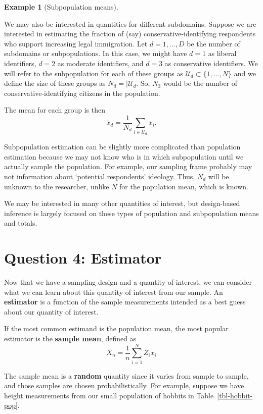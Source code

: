 \documentclass[
  13pt,
  letterpaper,
  DIV=11,
  numbers=noendperiod]{scrreprt}
\theoremstyle{definition}
\theoremstyle{definition}
\newtheorem{example}{Example}[chapter]
\theoremstyle{plain}
\theoremstyle{remark}
\begin{document}
\begin{example}[Subpopulation
means]\protect\hypertarget{exm-subpopulation}{}\label{exm-subpopulation}

We may also be interested in quantities for different subdomains.
Suppose we are interested in estimating the fraction of (say)
conservative-identifying respondents who support increasing legal
immigration. Let \(d= 1, \ldots, D\) be the number of subdomains or
subpopulations. In this case, we might have \(d = 1\) as liberal
identifiers, \(d = 2\) as moderate identifiers, and \(d = 3\) as
conservative identifiers. We will refer to the subpopulation for each of
these groups as \(\mathcal{U}_d \subset \{1,\ldots, N\}\) and we define
the size of these groups as \(N_d = |\mathcal{U}_d\). So, \(N_3\) would
be the number of conservative-identifying citizens in the population.

The mean for each group is then \[
\overline{x}_d = \frac{1}{N_d} \sum_{i \in \mathcal{U}_d} x_i.
\]

Subpopulation estimation can be slightly more complicated than
population estimation because we may not know who is in which
subpopulation until we actually sample the population. For example, our
sampling frame probably may not information about `potential
respondents' ideology. Thus, \(N_d\) will be unknown to the researcher,
unlike \(N\) for the population mean, which is known.

\end{example}

We may be interested in many other quantities of interest, but
design-based inference is largely focused on these types of population
and subpopulation means and totals.

\section{Question 4: Estimator}\label{question-4-estimator}

Now that we have a sampling design and a quantity of interest, we can
consider what we can learn about this quantity of interest from our
sample. An \textbf{estimator} is a function of the sample measurements
intended as a best guess about our quantity of interest.

If the most common estimand is the population mean, the most popular
estimator is the \textbf{sample mean}, defined as \[
\overline{X}_n = \frac{1}{n} \sum_{i=1}^{N}Z_ix_i
\]

The sample mean is a \textbf{random} quantity since it varies from
sample to sample, and those samples are chosen probabilistically. For
example, suppose we have height measurements from our small population
of hobbits in Table~\ref{tbl-hobbit-pop}.
\end{document}
